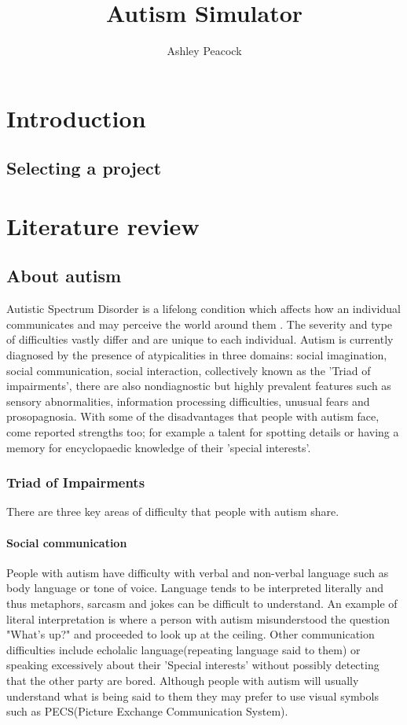 \documentclass[11pt]{report}
\begin{document}
\title{Autism Simulator}
\author{Ashley Peacock}
\maketitle
\tableofcontents
\chapter{Introduction}

\section{Selecting a project}


\chapter{Literature review}
\section{About autism}

Autistic Spectrum Disorder is a lifelong condition which affects how an individual communicates and may perceive the world around them \cite{nas}. The severity and type of difficulties vastly differ and are unique to each individual. Autism is currently diagnosed by the presence of atypicalities in three domains: social imagination, social communication, social interaction, collectively known as the 'Triad of impairments', there are also nondiagnostic but highly prevalent features such as sensory abnormalities, information processing difficulties, unusual fears and prosopagnosia. With some of the disadvantages that people with autism face, come reported strengths too; for example a talent for spotting details or having a memory for encyclopaedic knowledge of their 'special interests'. 


\subsection{Triad of Impairments}

There are three key areas of difficulty that people with autism share.

\subsubsection*{Social communication}
People with autism have difficulty with verbal and non-verbal language such as body language or tone of voice. Language tends to be interpreted literally and thus metaphors, sarcasm and jokes can be difficult to understand\cite{nas}. An example of literal interpretation is where a person with autism misunderstood the question "What's up?" and proceeded to look up at the ceiling. Other communication difficulties include echolalic language(repeating language said to them) or speaking excessively about their 'Special interests' without possibly detecting that the other party are bored. Although people with autism will usually understand what is being said to them they may prefer to use visual symbols such as PECS(Picture Exchange Communication System). 
\end{document}
